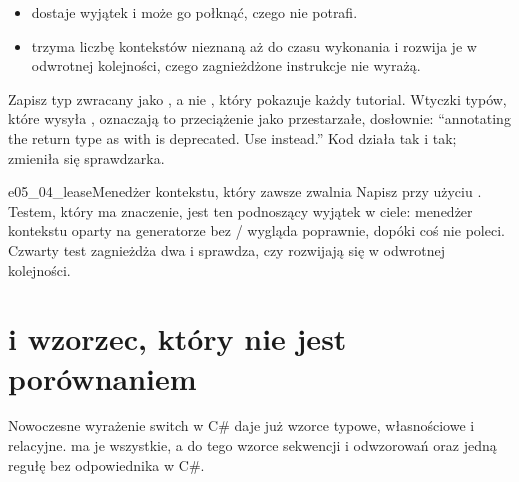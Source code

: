 \begin{itemize}[leftmargin=1.4em, itemsep=2pt]
  \item {} \dash{}  dostaje wyjątek i może
        go połknąć, czego  nie potrafi.
  \item {} \dash{} trzyma liczbę kontekstów nieznaną aż do
        czasu wykonania i rozwija je w odwrotnej kolejności, czego
        zagnieżdżone instrukcje  nie wyrażą.
\end{itemize}


\begin{versionbox}
Zapisz typ zwracany jako , a nie
, który pokazuje każdy tutorial. Wtyczki typów, które
wysyła  \pyrightver{}, oznaczają to przeciążenie jako
przestarzałe, dosłownie: \enquote{annotating the return type as
 with  is deprecated. Use
 instead.} Kod działa tak i tak; zmieniła się
sprawdzarka.
\end{versionbox}

\begin{exercise}{e05_04_lease}{Menedżer kontekstu, który zawsze zwalnia}
Napisz  przy użyciu . Testem,
który ma znaczenie, jest ten podnoszący wyjątek w ciele: menedżer kontekstu
oparty na generatorze bez / wygląda poprawnie,
dopóki coś nie poleci. Czwarty test
zagnieżdża dwa i sprawdza, czy rozwijają się w odwrotnej kolejności.
\end{exercise}

\section{ i wzorzec, który nie jest porównaniem}
\label{sec:ch05-match}

Nowoczesne wyrażenie switch w C\# daje już wzorce typowe, własnościowe i
relacyjne.  ma je wszystkie, a do tego wzorce sekwencji i
odwzorowań oraz jedną regułę bez odpowiednika w C\#.



